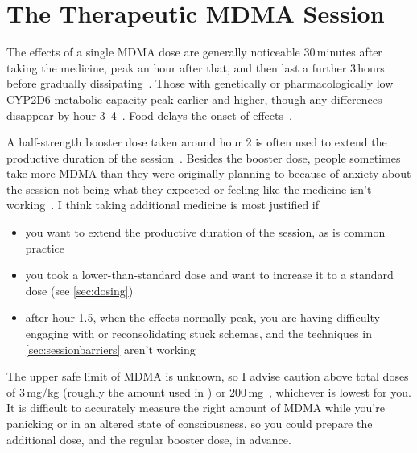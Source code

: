 \documentclass[11pt,oneside]{book}
\let\cite\parencite
\begin{document}

\section{The Therapeutic MDMA Session}
\label{session}
The effects of a single MDMA dose are generally noticeable 30\,minutes after taking the medicine, peak an hour after that, and then last a further 3\,hours before gradually dissipating~\cite{vizeliActuteEffects}. Those with genetically or pharmacologically low CYP2D6 metabolic capacity peak earlier and higher, though any differences disappear by hour 3--4~\cite{schmid2016cyp2d6}. Food delays the onset of effects~\cite{MithoeferMDMA}.

A half-strength booster dose taken around hour 2 is often used to extend the productive duration of the session~\cite{mitchellMDMAClinicalTrial2}. Besides the booster dose, people sometimes take more MDMA than they were originally planning to because of anxiety about the session not being what they expected or feeling like the medicine isn't working~\cite{bruntLinking}. I think taking additional medicine is most justified if
\begin{itemize}
    \item you want to extend the productive duration of the session, as is common practice
    \item you took a lower-than-standard dose and want to increase it to a standard dose (see \cref{sec:dosing})
    \item after hour 1.5, when the effects normally peak, you are having difficulty engaging with or reconsolidating stuck schemas, and the techniques in \cref{sec:sessionbarriers} aren't working
\end{itemize}
The upper safe limit of MDMA is unknown, so I advise caution above total doses of 3\,mg/kg (roughly the amount used in \textcite{mitchellMDMAClinicalTrial2}) or 200\,mg~\cite{liechtiInteractions}, whichever is lowest for you. It is difficult to accurately measure the right amount of MDMA while you're panicking or in an altered state of consciousness, so you could prepare the additional dose, and the regular booster dose, in advance.
\end{document}
